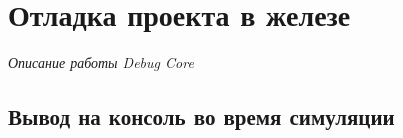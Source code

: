\chapter{Отладка проекта в железе}

\emph{Описание работы Debug Core}

\section{Вывод на консоль во время симуляции}
